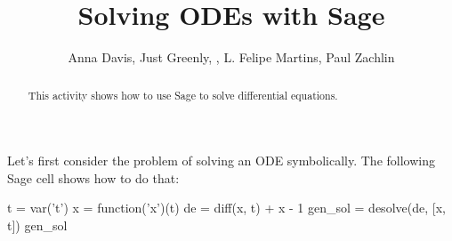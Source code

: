 \documentclass{ximera}
\title{Solving ODEs with Sage}
\author{Anna Davis, Just Greenly, , L. Felipe Martins, Paul Zachlin}
\begin{document}
\begin{abstract}
This activity shows how to use Sage to solve differential equations.

\end{abstract}

\maketitle

Let's first consider the problem of solving an ODE symbolically. The following Sage cell shows how to do that:

\begin{sageCell}
t = var('t')
x = function('x')(t)
de = diff(x, t) + x - 1
gen_sol = desolve(de, [x, t])
gen_sol
\end{sageCell}
\end{document}
